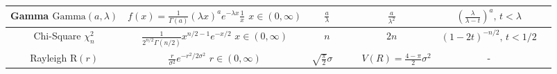 \documentclass[10pt,landscape]{article}
\newcommand{\Gam}{\textrm{Gamma}}
\begin{document}
\begin{center}
\begin{tabular}{cccccc}
\hline
\shortstack{Gamma \\ $\Gam(a, \lambda)$} & \shortstack{$f(x) = \frac{1}{\Gamma(a)}(\lambda x)^ae^{-\lambda x}\frac{1}{x}$\\$ x \in (0, \infty)$} & $\frac{a}{\lambda}$  & $\frac{a}{\lambda^2}$ & $\left(\frac{\lambda}{\lambda - t}\right)^a, \, t < \lambda$\\
\hline
\shortstack{Chi-Square \\ $\chi_n^2$} & \shortstack{$\frac{1}{2^{n/2}\Gamma(n/2)}x^{n/2 - 1}e^{-x/2}$\\$x \in (0, \infty) $} & $n$  & $2n$ & $(1 - 2t)^{-n/2}, \, t < 1/2$\\
\hline
\shortstack{Rayleigh \\ $\text{R}(r)$} & \shortstack{$\frac{r}{\sigma^2} e^{-r^2 / 2 \sigma^2}$\\$r \in (0, \infty) $} & $\sqrt{\frac{\pi}{2}} \sigma \quad$  & $\quad V(R)= \frac{4-\pi}{2} \sigma^2$ & -\\
\hline
\end{tabular}
\end{center}
\end{document}
